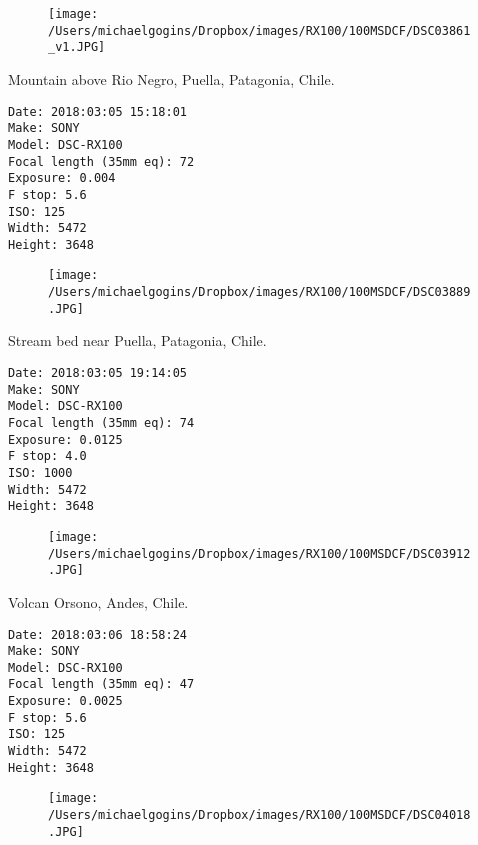 \documentclass[11pt,letter,DIV=14,paper=landscape]{scrbook}
\begin{document}
\begin{figure}
\texttt{[image: /Users/michaelgogins/Dropbox/images/RX100/100MSDCF/DSC03861\_v1.JPG]}
\end{figure}
    
\clearpage
\noindent Mountain above Rio Negro, Puella, Patagonia, Chile.
\noindent
\begin{lstlisting}
Date: 2018:03:05 15:18:01
Make: SONY
Model: DSC-RX100
Focal length (35mm eq): 72
Exposure: 0.004
F stop: 5.6
ISO: 125
Width: 5472
Height: 3648
\end{lstlisting}
\clearpage

\begin{figure}
\texttt{[image: /Users/michaelgogins/Dropbox/images/RX100/100MSDCF/DSC03889.JPG]}
\end{figure}
    
\clearpage
\noindent Stream bed near Puella, Patagonia, Chile.
\noindent
\begin{lstlisting}
Date: 2018:03:05 19:14:05
Make: SONY
Model: DSC-RX100
Focal length (35mm eq): 74
Exposure: 0.0125
F stop: 4.0
ISO: 1000
Width: 5472
Height: 3648
\end{lstlisting}
\clearpage

\begin{figure}
\texttt{[image: /Users/michaelgogins/Dropbox/images/RX100/100MSDCF/DSC03912.JPG]}
\end{figure}
    
\clearpage
\noindent Volcan Orsono, Andes, Chile.
\noindent
\begin{lstlisting}
Date: 2018:03:06 18:58:24
Make: SONY
Model: DSC-RX100
Focal length (35mm eq): 47
Exposure: 0.0025
F stop: 5.6
ISO: 125
Width: 5472
Height: 3648
\end{lstlisting}
\clearpage

\begin{figure}
\texttt{[image: /Users/michaelgogins/Dropbox/images/RX100/100MSDCF/DSC04018.JPG]}
\end{figure}
    
\end{document}
